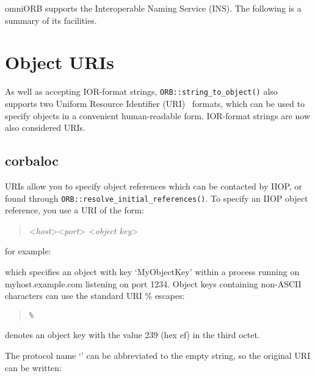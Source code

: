 \documentclass[11pt,oneside,a4paper]{book}
\newcommand{\op}[1]{\texttt{#1()}}
\begin{document}
omniORB supports the Interoperable Naming Service (INS). The following
is a summary of its facilities.


\section{Object URIs}

As well as accepting IOR-format strings, \op{ORB::string\_to\_object}
also supports two Uniform Resource Identifier (URI)~\cite{rfc2396}
formats, which can be used to specify objects in a convenient
human-readable form. IOR-format strings are now also considered URIs.

\subsection{corbaloc}

 URIs allow you to specify object references which
can be contacted by IIOP, or found through
\op{ORB::resolve\_initial\_references}. To specify an IIOP object
reference, you use a URI of the form:

\begin{quote}
<\textit{host}>\corbauri{:}<\textit{port}>%
\corbauri{/}<\textit{object key}>
\end{quote}

\noindent for example:

\begin{quote}
\end{quote}

\noindent which specifies an object with key `MyObjectKey' within a
process running on myhost.example.com listening on port 1234. Object
keys containing non-ASCII characters can use the standard URI \%
escapes:

\begin{quote}
%
\texttt{\%}%
\end{quote}

\noindent denotes an object key with the value 239 (hex ef) in the
third octet.

The protocol name `' can be abbreviated to the empty
string, so the original URI can be written:

\begin{quote}
\end{quote}
\end{document}
